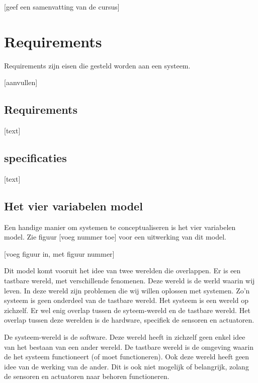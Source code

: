 \documentclass{article}
\begin{document}
	[geef een samenvatting van de cursus]
	
	\newpage
	
	
	\section{Requirements}
	
		Requirements zijn eisen die gesteld worden aan een systeem.

		[aanvullen]
		
		\subsection{Requirements}
		
		[text]
		
		\subsection{specificaties}
		
		[text]
		
		\subsection{Het vier variabelen model}
		
		Een handige manier om systemen te conceptualiseren is het vier variabelen model. Zie figuur [voeg nummer toe] voor een uitwerking van dit model.

		[voeg figuur in, met figuur nummer]

		Dit model komt vooruit het idee van twee werelden die overlappen. Er is een tastbare wereld, met verschillende fenomenen. Deze wereld is de werld waarin wij leven. In deze wereld zijn problemen die wij willen oplossen met systemen. Zo'n systeem is geen onderdeel van de tastbare wereld. Het systeem is een wereld op zichzelf. Er wel enig overlap tussen de syteem-wereld en de tastbare wereld. Het overlap tussen deze werelden is de hardware, specifiek de sensoren en actuatoren.

		De systeem-wereld is de software. Deze wereld heeft in zichzelf geen enkel idee van het bestaan van een ander wereld. De tastbare wereld is de omgeving waarin de het systeem functioneert (of moet functioneren). Ook deze wereld heeft geen idee van de werking van de ander. Dit is ook niet mogelijk of belangrijk, zolang de sensoren en actuatoren naar behoren functioneren.
\end{document}
